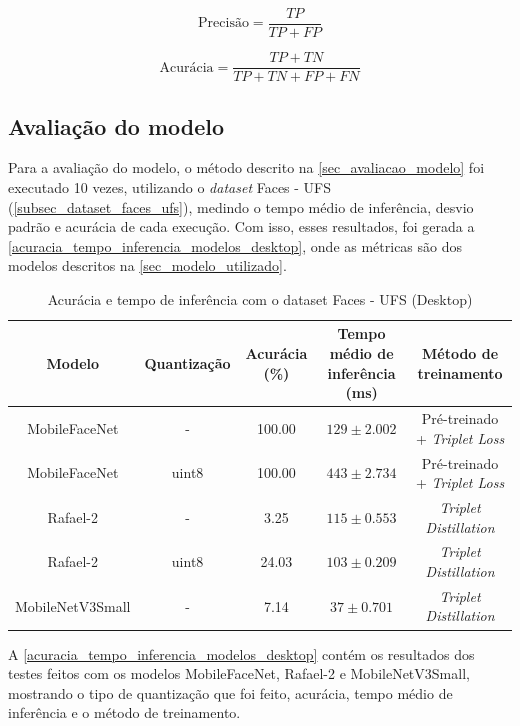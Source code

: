 \begin{equation}\label{eq_precisao}
	\text{Precisão} = \frac {TP} {TP + FP}
\end{equation}

\label{sect_restultados_metricas_acuracia}
\begin{equation}\label{eq_acuracia}
	\text{Acurácia} = \frac {TP + TN} {TP + TN + FP + FN}
\end{equation}

\subsection{Avaliação do modelo}
Para a avaliação do modelo, o método descrito na \autoref{sec_avaliacao_modelo} foi executado 10 vezes,
utilizando o \textit{dataset} Faces - UFS (\ref{subsec_dataset_faces_ufs}), medindo o tempo médio de inferência,
desvio padrão e acurácia de cada execução.
Com isso, esses resultados, foi gerada a \autoref{acuracia_tempo_inferencia_modelos_desktop}, onde as
métricas são dos modelos descritos na \autoref{sec_modelo_utilizado}.


\begin{table}[htb]
\centering
\ABNTEXfontereduzida
\caption[Acurácia e tempo de inferência com o dataset Faces - UFS (Desktop)]{Acurácia e tempo de inferência com o dataset Faces - UFS (Desktop)}
\label{acuracia_tempo_inferencia_modelos_desktop}
\begin{tabular}{ |c|c|c|c|c| }
	\hline
	\textbf{Modelo} & \textbf{Quantização} & \textbf{Acurácia (\%)} & \textbf{Tempo médio de inferência (ms)} & \textbf{Método de treinamento} \\
	\hline
	MobileFaceNet 	&-	& 	100.00  & $129 \pm 2.002$ & Pré-treinado + \textit{Triplet Loss} \\
	MobileFaceNet 	&uint8	& 	100.00  & $443 \pm 2.734$ & Pré-treinado + \textit{Triplet Loss} \\
	Rafael-2	&-	& 	 3.25 & $115 \pm 0.553$ & \textit{Triplet Distillation} \\
	Rafael-2	&uint8	& 	 24.03& $103 \pm 0.209$ & \textit{Triplet Distillation} \\
	MobileNetV3Small&-	& 	 7.14& $37 \pm 0.701$ & \textit{Triplet Distillation} \\
	\hline
\end{tabular}
\end{table}

A \autoref{acuracia_tempo_inferencia_modelos_desktop} contém os resultados dos testes feitos com os modelos
MobileFaceNet, Rafael-2 e MobileNetV3Small, mostrando o tipo de quantização que foi feito, acurácia, tempo
médio de inferência e o método de treinamento.

